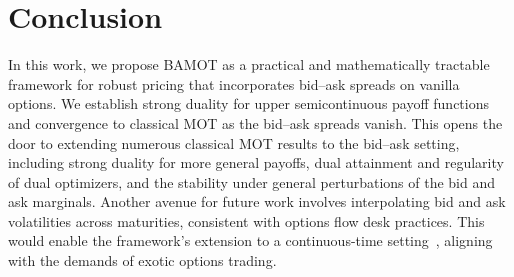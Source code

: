 \documentclass[11pt]{article}
\theoremstyle{plain}
\theoremstyle{definition}
\theoremstyle{remark}
\theoremstyle{plain}
\begin{document}

%
%
%
%
    
%
%


%
    

    


%
%

%
%
%
%
%
%
%
%
%
%
%
%
%
%
%
%
%
%
%



%
%
%
%
%
%
%

%
%
%
%
%
%


%


%

\section{Conclusion} 
\label{sec:future-work}

In this work, we propose BAMOT as a practical and mathematically tractable framework for robust pricing that incorporates bid--ask spreads on vanilla options. We establish strong duality for upper semicontinuous payoff functions and convergence to classical MOT as the bid--ask spreads vanish. This opens the door to extending numerous classical MOT results to the bid--ask setting, including strong duality for more general payoffs, dual attainment and regularity of dual optimizers, and the stability under general perturbations of the bid and ask marginals. Another avenue for future work involves interpolating bid and ask volatilities across maturities, consistent with options flow desk practices. This would enable the framework's extension to a continuous-time setting~\cite{DOLINSKYSonerContinuous,HouObloj2018}, aligning with the demands of exotic options trading. 

%


%

%

%

%
%
%
%
%

%
%
%
%
%
%
%
%
%
%
%
%
%

%
%

%
%

%
%
%
%

%
%
%
%
%
%
%
%
%
%
%
%

%
%
%
%
    
%
%


%
%

%

%
%
%
%


%
%
%
%
%

%
%
%
\end{document}
